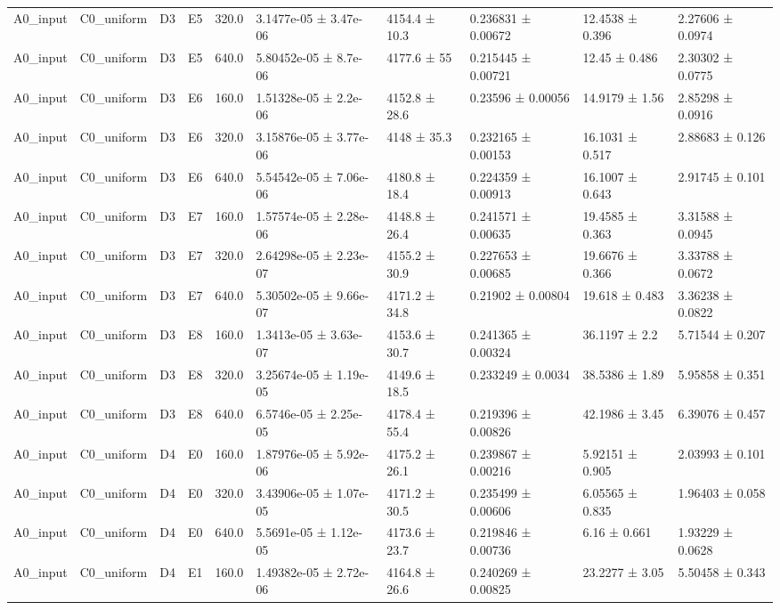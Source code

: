 \begin{table}
\begin{tabular}{llllllllll}
A0\_input & C0\_uniform & D3 & E5 & 320.0 & 3.1477e-05 ± 3.47e-06 & 4154.4 ± 10.3 & 0.236831 ± 0.00672 & 12.4538 ± 0.396 & 2.27606 ± 0.0974 \\
A0\_input & C0\_uniform & D3 & E5 & 640.0 & 5.80452e-05 ± 8.7e-06 & 4177.6 ± 55 & 0.215445 ± 0.00721 & 12.45 ± 0.486 & 2.30302 ± 0.0775 \\
A0\_input & C0\_uniform & D3 & E6 & 160.0 & 1.51328e-05 ± 2.2e-06 & 4152.8 ± 28.6 & 0.23596 ± 0.00056 & 14.9179 ± 1.56 & 2.85298 ± 0.0916 \\
A0\_input & C0\_uniform & D3 & E6 & 320.0 & 3.15876e-05 ± 3.77e-06 & 4148 ± 35.3 & 0.232165 ± 0.00153 & 16.1031 ± 0.517 & 2.88683 ± 0.126 \\
A0\_input & C0\_uniform & D3 & E6 & 640.0 & 5.54542e-05 ± 7.06e-06 & 4180.8 ± 18.4 & 0.224359 ± 0.00913 & 16.1007 ± 0.643 & 2.91745 ± 0.101 \\
A0\_input & C0\_uniform & D3 & E7 & 160.0 & 1.57574e-05 ± 2.28e-06 & 4148.8 ± 26.4 & 0.241571 ± 0.00635 & 19.4585 ± 0.363 & 3.31588 ± 0.0945 \\
A0\_input & C0\_uniform & D3 & E7 & 320.0 & 2.64298e-05 ± 2.23e-07 & 4155.2 ± 30.9 & 0.227653 ± 0.00685 & 19.6676 ± 0.366 & 3.33788 ± 0.0672 \\
A0\_input & C0\_uniform & D3 & E7 & 640.0 & 5.30502e-05 ± 9.66e-07 & 4171.2 ± 34.8 & 0.21902 ± 0.00804 & 19.618 ± 0.483 & 3.36238 ± 0.0822 \\
A0\_input & C0\_uniform & D3 & E8 & 160.0 & 1.3413e-05 ± 3.63e-07 & 4153.6 ± 30.7 & 0.241365 ± 0.00324 & 36.1197 ± 2.2 & 5.71544 ± 0.207 \\
A0\_input & C0\_uniform & D3 & E8 & 320.0 & 3.25674e-05 ± 1.19e-05 & 4149.6 ± 18.5 & 0.233249 ± 0.0034 & 38.5386 ± 1.89 & 5.95858 ± 0.351 \\
A0\_input & C0\_uniform & D3 & E8 & 640.0 & 6.5746e-05 ± 2.25e-05 & 4178.4 ± 55.4 & 0.219396 ± 0.00826 & 42.1986 ± 3.45 & 6.39076 ± 0.457 \\
A0\_input & C0\_uniform & D4 & E0 & 160.0 & 1.87976e-05 ± 5.92e-06 & 4175.2 ± 26.1 & 0.239867 ± 0.00216 & 5.92151 ± 0.905 & 2.03993 ± 0.101 \\
A0\_input & C0\_uniform & D4 & E0 & 320.0 & 3.43906e-05 ± 1.07e-05 & 4171.2 ± 30.5 & 0.235499 ± 0.00606 & 6.05565 ± 0.835 & 1.96403 ± 0.058 \\
A0\_input & C0\_uniform & D4 & E0 & 640.0 & 5.5691e-05 ± 1.12e-05 & 4173.6 ± 23.7 & 0.219846 ± 0.00736 & 6.16 ± 0.661 & 1.93229 ± 0.0628 \\
A0\_input & C0\_uniform & D4 & E1 & 160.0 & 1.49382e-05 ± 2.72e-06 & 4164.8 ± 26.6 & 0.240269 ± 0.00825 & 23.2277 ± 3.05 & 5.50458 ± 0.343 \\

\end{tabular}
\end{table}
